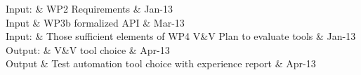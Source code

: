 \documentclass{template/openetcs_article}
\begin{document}

\begin{inoutput}
Input: & WP2 Requirements & Jan-13 \\
Input  & WP3b formalized API & Mar-13 \\ 
Input: & Those sufficient elements of WP4 V\&V Plan to evaluate tools & Jan-13 \\
\hline
Output: & V\&V tool choice & Apr-13 \\
Output  &  Test automation tool choice with experience report & Apr-13 \\
\end{inoutput}
\end{document}
